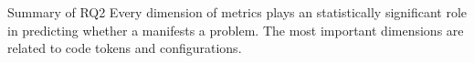 \vspace{0.5cm}
\begin{Summary}{Summary of RQ2}{}
Every dimension of metrics plays an statistically significant role in predicting whether a \instance manifests a \inconsistent problem. The most important dimensions are related to code tokens and configurations. 
\end{Summary}


